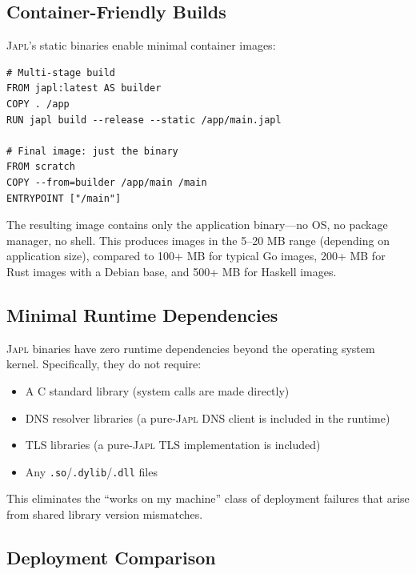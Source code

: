\documentclass[11pt,twocolumn]{article}
\newcommand{\japl}{\textsc{Japl}}
\begin{document}
\subsection{Container-Friendly Builds}

\japl{}'s static binaries enable minimal container images:

\begin{lstlisting}[language=shell,basicstyle=\ttfamily\tiny]
# Multi-stage build
FROM japl:latest AS builder
COPY . /app
RUN japl build --release --static /app/main.japl

# Final image: just the binary
FROM scratch
COPY --from=builder /app/main /main
ENTRYPOINT ["/main"]
\end{lstlisting}

The resulting image contains only the application binary---no OS, no package manager, no shell.
This produces images in the 5--20 MB range (depending on application size), compared to 100+ MB for typical Go images, 200+ MB for Rust images with a Debian base, and 500+ MB for Haskell images.

\subsection{Minimal Runtime Dependencies}

\japl{} binaries have zero runtime dependencies beyond the operating system kernel.
Specifically, they do not require:
\begin{itemize}[leftmargin=*]
\item A C standard library (system calls are made directly)
\item DNS resolver libraries (a pure-\japl{} DNS client is included in the runtime)
\item TLS libraries (a pure-\japl{} TLS implementation is included)
\item Any \texttt{.so}/\texttt{.dylib}/\texttt{.dll} files
\end{itemize}

This eliminates the ``works on my machine'' class of deployment failures that arise from shared library version mismatches.

\subsection{Deployment Comparison}
\end{document}
